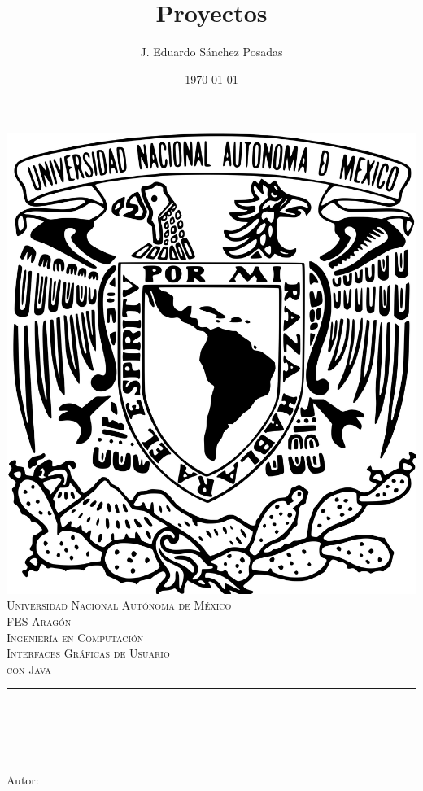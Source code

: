 \documentclass[11pt]{article}
\title{Proyectos}						%
\author{J. Eduardo Sánchez Posadas}					%
\date{\today}											%
\makeatletter
\let\thetitle\@title
\let\theauthor\@author
\makeatother
\begin{document}

\begin{titlepage}
	\centering
    \vspace*{0.5 cm}
    \includegraphics[scale=0.05]{pics/escudo.png} \\[1.0 cm]	%
    \textsc{\Huge Universidad Nacional Autónoma de México}\\[2.0 cm]	%
	\textsc{\Huge FES Aragón\\ Ingeniería en Computación}\\[0.5 cm]								%
	\textsc{\Large Interfaces Gráficas de Usuario \\ con Java}\\[0.5 cm]	%
	\rule{\linewidth}{0.2 mm} \\[0.4 cm]
	{ \huge \bfseries \thetitle}\\
	\rule{\linewidth}{0.2 mm} \\[1.5 cm]
	 			{Autor: \large \theauthor}
%
	

\end{titlepage}
\end{document}
